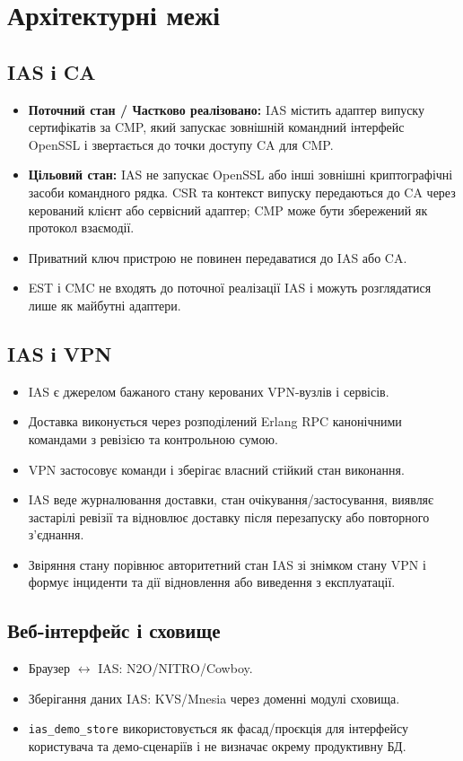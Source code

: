 \documentclass{article}
\begin{document}
\section{Архітектурні межі}
\subsection{IAS і CA}
\begin{itemize}
  \item \textbf{Поточний стан / Частково реалізовано:} IAS містить адаптер випуску сертифікатів за CMP, який запускає зовнішній командний інтерфейс OpenSSL і звертається до точки доступу CA для CMP.
  \item \textbf{Цільовий стан:} IAS не запускає OpenSSL або інші зовнішні криптографічні засоби командного рядка. CSR та контекст випуску передаються до CA через керований клієнт або сервісний адаптер; CMP може бути збережений як протокол взаємодії.
  \item Приватний ключ пристрою не повинен передаватися до IAS або CA.
  \item EST і CMC не входять до поточної реалізації IAS і можуть розглядатися лише як майбутні адаптери.
\end{itemize}

\subsection{IAS і VPN}
\begin{itemize}
  \item IAS є джерелом бажаного стану керованих VPN-вузлів і сервісів.
  \item Доставка виконується через розподілений Erlang RPC канонічними командами з ревізією та контрольною сумою.
  \item VPN застосовує команди і зберігає власний стійкий стан виконання.
  \item IAS веде журналювання доставки, стан очікування/застосування, виявляє застарілі ревізії та відновлює доставку після перезапуску або повторного з’єднання.
  \item Звіряння стану порівнює авторитетний стан IAS зі знімком стану VPN і формує інциденти та дії відновлення або виведення з експлуатації.
\end{itemize}

\subsection{Веб-інтерфейс і сховище}
\begin{itemize}
  \item Браузер $\leftrightarrow$ IAS: N2O/NITRO/Cowboy.
  \item Зберігання даних IAS: KVS/Mnesia через доменні модулі сховища.
  \item \texttt{ias\_demo\_store} використовується як фасад/проєкція для інтерфейсу користувача та демо-сценаріїв і не визначає окрему продуктивну БД.
\end{itemize}
\end{document}
